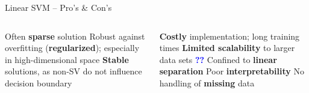 
\setdraft

\begin{frame}{Linear SVM -- Pro's \& Con's}

\begin{columns}[onlytextwidth]
  \begin{column}{0.5\textwidth}
    \footnotesize
    \begin{itemize}
      \positem Often \textbf{sparse} solution
      \positem Robust against overfitting (\textbf{regularized}); especially in 
      high-dimensional space
      \positem \textbf{Stable} solutions, as non-SV do not influence decision 
      boundary
    \end{itemize}
  \end{column}

  \begin{column}{0.5\textwidth}
    \footnotesize
    \begin{itemize}
      \negitem \textbf{Costly} implementation; long training times
      \negitem \textbf{Limited scalability} to larger data sets 
      \textcolor{blue}{\textbf{??}}
      \negitem Confined to \textbf{linear separation}
      \negitem Poor \textbf{interpretability}
      \negitem No handling of \textbf{missing} data
    \end{itemize}
  \end{column}
\end{columns}

\vfill

\small


\end{frame}

\undraft


